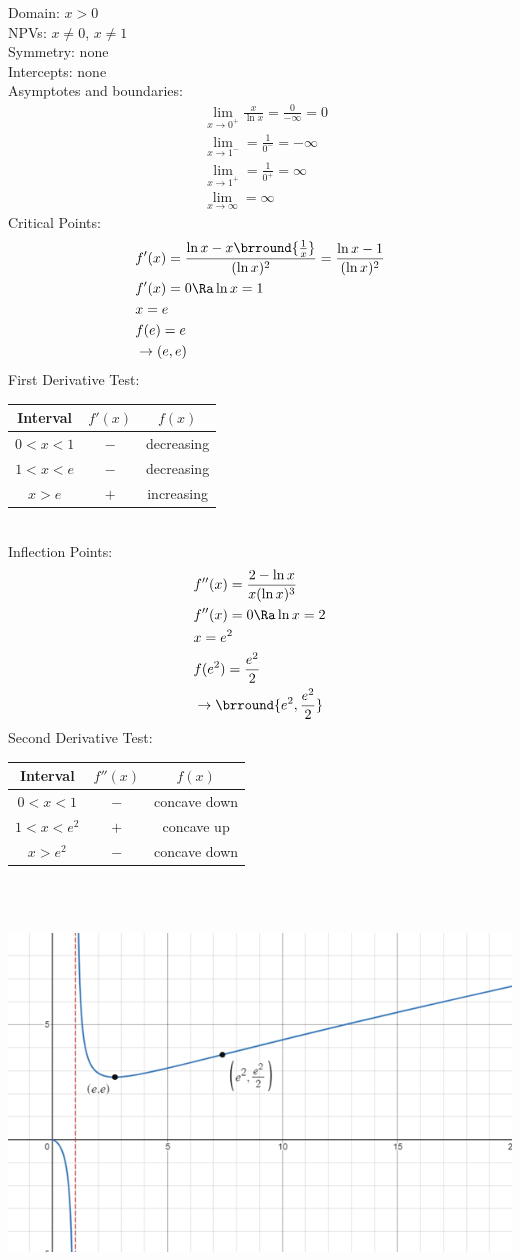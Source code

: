 Domain: $x>0$\\
NPVs: $x\neq 0$, $x\neq 1$\\
Symmetry: none\\
Intercepts: none\\
Asymptotes and boundaries:
\begin{align*}
    &\lim_{x\to 0^+}\frac{x}{\ln x}=\frac{0}{-\infty}=0\\
    &\lim_{x\to 1^-}=\frac{1}{0^-}=-\infty\\
    &\lim_{x\to 1^+}=\frac{1}{0^+}=\infty\\
    &\lim_{x\to \infty}=\infty
\end{align*}
Critical Points:
\begin{align*}
    &f'(x)=\frac{\ln x-x\brround{\frac{1}{x}}}{(\ln x)^2}=\frac{\ln x-1}{(\ln x)^2}\\
    &f'(x)=0\Ra \ln x=1\\
    &x=e\\
    &f(e)=e\\
    &\rightarrow (e,e)
\end{align*}
First Derivative Test:\\
\begin{tabular}{c||c|c}
    Interval & $f'(x)$ & $f(x)$\\
    \hline
    $0<x<1$ & $-$ & decreasing\\
    $1<x<e$ & $-$ & decreasing\\
    $x>e$ & $+$ & increasing
\end{tabular}\\
Inflection Points:
\begin{align*}
    &f''(x)=\frac{2-\ln x}{x(\ln x)^3}\\
    &f''(x)=0\Ra \ln x=2\\
    &x=e^2\\
    &f(e^2)=\frac{e^2}{2}\\
    &\rightarrow \brround{e^2,\frac{e^2}{2}}
\end{align*}
Second Derivative Test:\\
\begin{tabular}{c||c|c}
    Interval & $f''(x)$ & $f(x)$\\
    \hline
    $0<x<1$ & $-$ & concave down\\
    $1<x<e^2$ & $+$ & concave up\\
    $x>e^2$ & $-$ & concave down
\end{tabular}\\
\\
\centerline{\includegraphics[scale=0.9]{Images/DifferentialCalculusPictures/SketchingEx1.png}}
